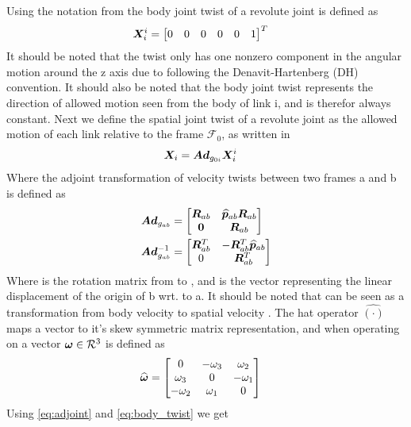 Using the notation from \cite{kristin_jant} the body joint twist of a revolute joint is defined as 
\begin{align}
	\boldsymbol X_i^i&=\begin{bmatrix} 0&0&0&0&0&1\end{bmatrix}^T
	\label{eq:body_twist}
\end{align}
It should be noted that the twist only has one nonzero component in the angular motion around the z axis due to following the Denavit-Hartenberg (DH) convention. It should also be noted that the body joint twist represents the direction of allowed motion seen from the body of link i, and is therefor always constant.
Next we define the spatial joint twist of a revolute joint as the allowed motion of each link relative to the frame $\mathcal{F}_0$, as written in \cite{kristin_jant}
\begin{align}
	\boldsymbol X_i&=\boldsymbol{Ad}_{g_{0i}}\boldsymbol X_i^i
	\label{eq:spatioal_twist}
\end{align}
Where the adjoint transformation of velocity twists between two frames \frame a and \frame b is defined as
\begin{align}
	\boldsymbol{Ad}_{g_{ab}}  &= \begin{bmatrix} \boldsymbol R_{ab} & \widehat{\boldsymbol p}_{ab}\boldsymbol R_{ab} \\ \boldsymbol 0 & \boldsymbol R_{ab} \end{bmatrix}
	\label{eq:adjoint}
  \\
	\boldsymbol{Ad}_{g_{ab}}^{-1} &= \begin{bmatrix} \boldsymbol R_{ab}^T & - \boldsymbol R_{ab}^T \widehat{\boldsymbol p}_{ab} \\ 0 & \boldsymbol R_{ab}^T \end{bmatrix}
	\label{eq:adjoint2}
\end{align}
Where  is the rotation matrix from  to , and  is the vector representing the linear displacement of the origin of \frame b wrt. to \frame a. It should be noted that  can be seen as a transformation from body velocity  to spatial velocity .
The hat operator $\widehat{(\cdot)}$ maps a vector to it's skew symmetric matrix representation, and when operating on a vector $\boldsymbol \omega \in \mathcal{R}^3$ is defined as
 \begin{align}
   \widehat{\boldsymbol \omega}&= \begin{bmatrix} 0 & -\omega_3 & \omega_2 \\ \omega_3 & 0 & -\omega_1 \\ -\omega_2 & \omega_1 & 0 \end{bmatrix} 
   \label{eq:skewsym}
 \end{align}
Using  \eqref{eq:adjoint} and \eqref{eq:body_twist} we get

